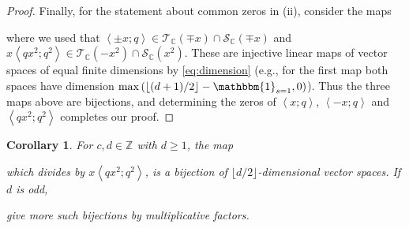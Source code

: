 \documentclass[reqno,11pt]{amsart}
\newtheorem{corollary}[theorem]{Corollary}
\theoremstyle{definition}
\theoremstyle{remark}
\numberwithin{equation}{section}
\newcommand{\Z}{\mathbb{Z}}
\newcommand{\C}{\mathbb{C}}
\newcommand{\mT}{\mathcal{T}}
\newcommand{\mS}{\mathcal{S}}
\newcommand{\one}{\mathbbm{1}}
\newcommand{\la}{\left\langle}
\newcommand{\ra}{\right\rangle}
\newcommand{\vect}[2]{\big[{#1};{#2}\big]}
\begin{document}
\begin{proof}
Finally, for the statement about common zeros in (ii), consider the maps
\begin{center}
\end{center}
where we used that $\la \pm x; q\ra \in \mT_\C\left(\mp x\right) \cap \mS_\C\left(\mp x\right)$ and $x\la qx^2; q^2\ra \in \mT_\C\left(-x^2\right) \cap \mS_\C\left(x^2\right)$. These are injective linear maps of vector spaces of equal finite dimensions by \cref{eq:dimension} (e.g., for the first map both spaces have dimension $\max\left(\lfloor(d+1)/2\rfloor - \one_{s = 1}, 0\right)$). Thus the three maps above are bijections, and determining the zeros of $\la x; q\ra$, $\la -x; q\ra$ and $\la qx^2; q^2 \ra$ completes our proof.
\end{proof}

\begin{corollary} \label{cor:bijections}
For $c, d \in \Z$ with $d \ge 1$, the map
\begin{center}
\end{center}
which divides by $x\la qx^2; q^2 \ra$, is a bijection of $\lfloor d/2 \rfloor$-dimensional vector spaces. If $d$ is odd,
\begin{center}
\small
{}
\end{center}
give more such bijections by multiplicative factors.
\end{corollary}
\end{document}
